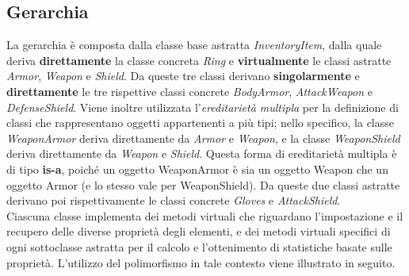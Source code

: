 \subsection{Gerarchia}
La gerarchia è composta dalla classe base astratta \textit{InventoryItem}, dalla quale deriva \textbf{direttamente} la classe concreta \textit{Ring} e \textbf{virtualmente} le classi astratte \textit{Armor}, \textit{Weapon} e \textit{Shield}. Da queste tre classi derivano \textbf{singolarmente} e \textbf{direttamente} le tre rispettive classi concrete \textit{BodyArmor}, \textit{AttackWeapon} e \textit{DefenseShield}. Viene inoltre utilizzata l'\textit{ereditarietà multipla} per la definizione di classi che rappresentano oggetti appartenenti a più tipi; nello specifico, la classe \textit{WeaponArmor} deriva direttamente da \textit{Armor} e \textit{Weapon}, e la classe \textit{WeaponShield} deriva direttamente da \textit{Weapon} e \textit{Shield}. Questa forma di ereditarietà multipla è di tipo \textbf{is-a}, poiché un oggetto WeaponArmor è sia un oggetto Weapon che un oggetto Armor (e lo stesso vale per WeaponShield). Da queste due classi astratte derivano poi rispettivamente le classi concrete \textit{Gloves} e \textit{AttackShield}. \\
Ciascuna classe implementa dei metodi virtuali che riguardano l'impostazione e il recupero delle diverse proprietà degli elementi, e dei metodi virtuali specifici di ogni sottoclasse astratta per il calcolo e l'ottenimento di statistiche basate sulle proprietà. L'utilizzo del polimorfismo in tale contesto viene illustrato in seguito.

